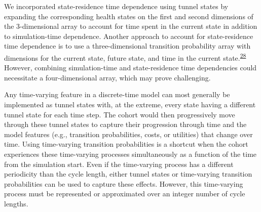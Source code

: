 \documentclass[
]{article}
\begin{document}
We incorporated state-residence time dependence using tunnel states by expanding the corresponding health states on the first and second dimensions of the 3-dimensional array to account for time spent in the current state in addition to simulation-time dependence. Another approach to account for state-residence time dependence is to use a three-dimensional transition probability array with dimensions for the current state, future state, and time in the current state.\textsuperscript{\protect\hyperlink{ref-Hawkins2005}{28}} However, combining simulation-time and state-residence time dependencies could necessitate a four-dimensional array, which may prove challenging.

Any time-varying feature in a discrete-time model can most generally be implemented as tunnel states with, at the extreme, every state having a different tunnel state for each time step. The cohort would then progressively move through these tunnel states to capture their progression through time and the model features (e.g., transition probabilities, costs, or utilities) that change over time. Using time-varying transition probabilities is a shortcut when the cohort experiences these time-varying processes simultaneously as a function of the time from the simulation start. Even if the time-varying process has a different periodicity than the cycle length, either tunnel states or time-varying transition probabilities can be used to capture these effects. However, this time-varying process must be represented or approximated over an integer number of cycle lengths.
\end{document}
